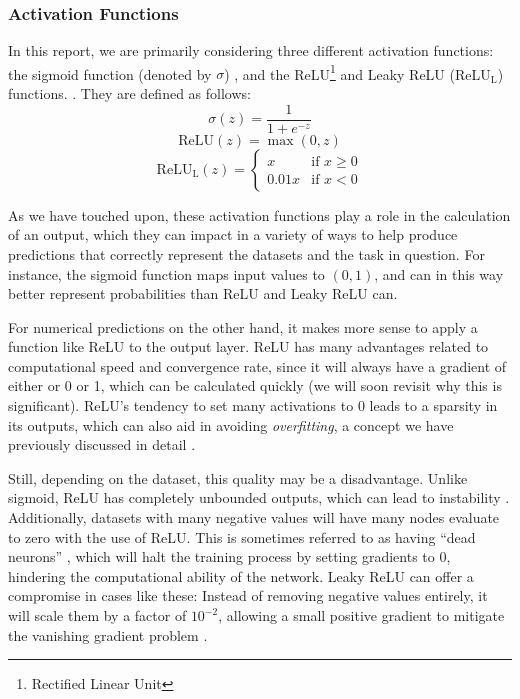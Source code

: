 \subsubsection{Activation Functions}
In this report, we are primarily considering three different activation functions: the sigmoid function (denoted by $\sigma$) \cite{sigmoid}, and the ReLU\footnote{Rectified Linear Unit} and Leaky ReLU (ReLU$_\text{L}$) functions. \cite{ReLU}. They are defined as follows:
\[\sigma(z) = \frac{1}{1 + e^{-z}}\]
\[\text{ReLU}(z) = \max(0, z)\]
\begin{equation*}
\text{ReLU}_{\text{L}}(z) = 
\begin{cases} 
    x & \text{if } x \geq 0 \\
    0.01 x & \text{if } x < 0 
\end{cases}
\end{equation*}

As we have touched upon, these activation functions play a role in the calculation of an output, which they can impact in a variety of ways to help produce predictions that correctly represent the datasets and the task in question. For instance, the sigmoid function maps input values to $(0,1)$, and can in this way better represent probabilities than ReLU and Leaky ReLU can. 

For numerical predictions on the other hand, it makes more sense to apply a function like ReLU to the output layer. ReLU has many advantages related to computational speed and convergence rate, since it will always have a gradient of either or 0 or 1, which can be calculated quickly \cite{mediumReLU} (we will soon revisit why this is significant). ReLU's tendency to set many activations to 0 leads to a sparsity in its outputs, which can also aid in avoiding \emph{overfitting}, a concept we have previously discussed in detail \cite{fysstkproject1}. 

Still, depending on the dataset, this quality may be a disadvantage. Unlike sigmoid, ReLU has completely unbounded outputs, which can lead to instability \cite{mediumReLU}. Additionally, datasets with many negative values will have many nodes evaluate to zero with the use of ReLU. This is sometimes referred to as having ``dead neurons'' \cite{mediumReLU}, which will halt the training process by setting gradients to 0, hindering the computational ability of the network. Leaky ReLU can offer a compromise in cases like these: Instead of removing negative values entirely, it will scale them by a factor of $10^{-2}$, allowing a small positive gradient to mitigate the vanishing gradient problem \cite{ReLU}.

